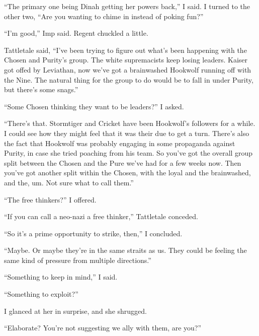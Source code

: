 ``The primary one being Dinah getting her powers back,'' I said.  I turned to the other two, ``Are you wanting to chime in instead of poking fun?''



``I'm good,'' Imp said.  Regent chuckled a little.



Tattletale said, ``I've been trying to figure out what's been happening with the Chosen and Purity's group.  The white supremacists keep losing leaders.  Kaiser got offed by Leviathan, now we've got a brainwashed Hookwolf running off with the Nine.  The natural thing for the group to do would be to fall in under Purity, but there's some snags.''



``Some Chosen thinking they want to be leaders?'' I asked.



``There's that.  Stormtiger and Cricket have been Hookwolf's followers for a while.  I could see how they might feel that it was their due to get a turn.  There's also the fact that Hookwolf was probably engaging in some propaganda against Purity, in case she tried poaching from his team.  So you've got the overall group split between the Chosen and the Pure we've had for a few weeks now.  Then you've got another split within the Chosen, with the loyal and the brainwashed, and the, um.  Not sure what to call them.''



``The free thinkers?'' I offered.



``If you can call a neo-nazi a free thinker,'' Tattletale conceded.



``So it's a prime opportunity to strike, then,'' I concluded.



``Maybe.  Or maybe they're in the same straits as us.  They could be feeling the same kind of pressure from multiple directions.''



``Something to keep in mind,'' I said.



``Something to exploit?''



I glanced at her in surprise, and she shrugged.



``Elaborate?  You're not suggesting we ally with them, are you?''




